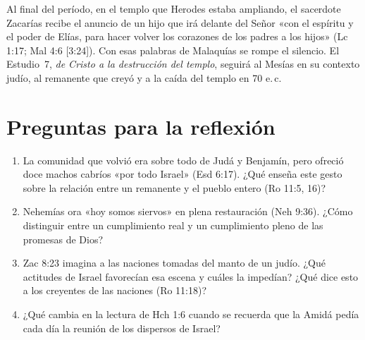 Al final del período, en el templo que Herodes estaba ampliando, el sacerdote Zacarías recibe el anuncio de un hijo que irá delante del Señor «con el espíritu y el poder de Elías, para hacer volver los corazones de los padres a los hijos» (Lc 1:17; Mal 4:6 [3:24]). Con esas palabras de Malaquías se rompe el silencio. El Estudio~7, \emph{de Cristo a la destrucción del templo}, seguirá al Mesías en su contexto judío, al remanente que creyó y a la caída del templo en 70 e.\,c.

\section*{Preguntas para la reflexión}
\begin{enumerate}
\item La comunidad que volvió era sobre todo de Judá y Benjamín, pero ofreció doce machos cabríos «por todo Israel» (Esd 6:17). ¿Qué enseña este gesto sobre la relación entre un remanente y el pueblo entero (Ro 11:5, 16)?
\item Nehemías ora «hoy somos siervos» en plena restauración (Neh 9:36). ¿Cómo distinguir entre un cumplimiento real y un cumplimiento pleno de las promesas de Dios?
\item Zac 8:23 imagina a las naciones tomadas del manto de un judío. ¿Qué actitudes de Israel favorecían esa escena y cuáles la impedían? ¿Qué dice esto a los creyentes de las naciones (Ro 11:18)?
\item ¿Qué cambia en la lectura de Hch 1:6 cuando se recuerda que la Amidá pedía cada día la reunión de los dispersos de Israel?
\end{enumerate}

